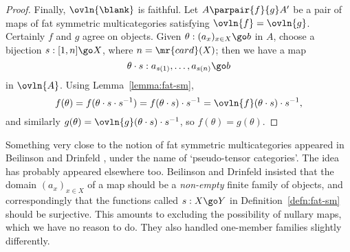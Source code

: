 \begin{proof}
Finally, $\ovln{\blank}$ is faithful.  Let $A \parpair{f}{g} A'$ be a pair
of maps of fat symmetric multicategories satisfying $\ovln{f} = \ovln{g}$.
Certainly $f$ and $g$ agree on objects.  Given $\theta: (a_x)_{x\in X} \go
b$ in $A$, choose a bijection $s: [1,n] \go X$, where $n=\mr{card}(X)$;
then we have a map 
\[
\theta\cdot s: a_{s(1)}, \ldots, a_{s(n)} \go b
\]
in $\ovln{A}$.  Using Lemma~\ref{lemma:fat-sm},
\[
f(\theta)
=
f(\theta\cdot s \cdot s^{-1})
=
f(\theta\cdot s) \cdot s^{-1}
=
\ovln{f}(\theta\cdot s) \cdot s^{-1},
\]
and similarly $g(\theta) = \ovln{g}(\theta\cdot s) \cdot s^{-1}$, so
$f(\theta) = g(\theta)$. 
\done
\end{proof}%
%
%


\begin{notes}

Something very close to the notion of fat symmetric multicategories
appeared in Beilinson%
%
%
and Drinfeld%
%
%
\cite[\S 1.1]{BeDr}, under the name of
`pseudo-tensor%
%
%
%
%
categories'.  The idea has probably appeared elsewhere too.
Beilinson and Drinfeld insisted that the domain $(a_x)_{x\in X}$ of a map
should be a \emph{non-empty} finite family of objects, and correspondingly
that the functions called $s: X\go Y$ in Definition~\ref{defn:fat-sm}
should be surjective.  This amounts to excluding the possibility of
nullary%
%
%
maps, which we have no reason to do.  They also handled one-member families
slightly differently.







\end{notes}
